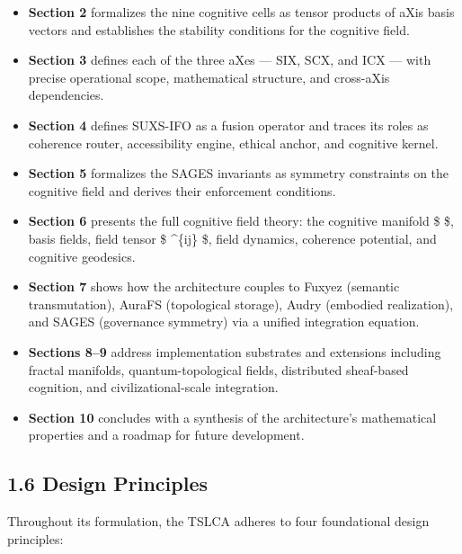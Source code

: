 \begin{itemize}
\tightlist
\item
  \textbf{Section 2} formalizes the nine cognitive cells as tensor products of aXis basis vectors and establishes the stability conditions for the cognitive field.
\item
  \textbf{Section 3} defines each of the three aXes --- SIX, SCX, and ICX --- with precise operational scope, mathematical structure, and cross-aXis dependencies.
\item
  \textbf{Section 4} defines SUXS-IFO as a fusion operator and traces its roles as coherence router, accessibility engine, ethical anchor, and cognitive kernel.
\item
  \textbf{Section 5} formalizes the SAGES invariants as symmetry constraints on the cognitive field and derives their enforcement conditions.
\item
  \textbf{Section 6} presents the full cognitive field theory: the cognitive manifold \$  \$, basis fields, field tensor \$ \Phi\^{}\{ij\} \$, field dynamics, coherence potential, and cognitive geodesics.
\item
  \textbf{Section 7} shows how the architecture couples to Fuxyez (semantic transmutation), AuraFS (topological storage), Audry (embodied realization), and SAGES (governance symmetry) via a unified integration equation.
\item
  \textbf{Sections 8--9} address implementation substrates and extensions including fractal manifolds, quantum-topological fields, distributed sheaf-based cognition, and civilizational-scale integration.
\item
  \textbf{Section 10} concludes with a synthesis of the architecture's mathematical properties and a roadmap for future development.
\end{itemize}

\subsection{1.6 Design Principles}\label{design-principles}

Throughout its formulation, the TSLCA adheres to four foundational design principles:

